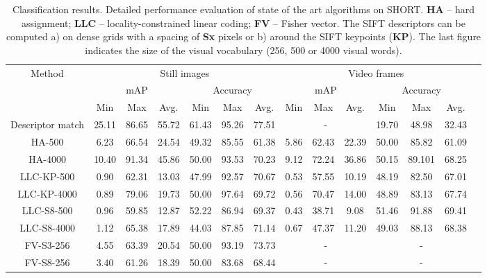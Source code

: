 \begin{table}
\centering
\begin{adjustbox}{max width=1.2\textwidth,center}
\begin{tabular}{cccccccccccccc}
   \toprule
\multirow{3}{*}{Method} & \multicolumn{6}{c}{Still images} & \multicolumn{6}{c}{Video frames}\\
\cline{2-13} 
 &  \multicolumn{3}{c}{mAP} & \multicolumn{3}{c}{Accuracy} & \multicolumn{3}{c}{mAP} & \multicolumn{3}{c}{ Accuracy}\\
& Min & Max & Avg. & Min & Max & Avg. & Min & Max & Avg. & Min & Max & Avg.\\
\hline \hline 
Descriptor match & 25.11 & 86.65 & 55.72 & 61.43 & 95.26 & 77.51 & \multicolumn{3}{c}{-} & 19.70 & 48.98 & 32.43\\
\hline
HA-500 & 6.23 & 66.54 & 24.54 & 49.32 & 85.55 & 61.38 & 5.86 & 62.43 & 22.39 &50.00 & 85.82 & 61.09\\
\hline
HA-4000 & 10.40 & 91.34 & 45.86 & 50.00 & 93.53 & 70.23 & 9.12 & 72.24 & 36.86 & 50.15 & 89.101 & 68.25 \\
\hline
LLC-KP-500 & 0.90 & 62.31 & 13.03 & 47.99 & 92.57 & 70.67  & 0.53 & 57.55 & 10.19 & 48.19 & 82.50 & 67.01\\
\hline
LLC-KP-4000 & 0.89 & 79.06 & 19.73 & 50.00 & 97.64 & 69.72 & 0.56 & 70.47 & 14.00 & 48.89 & 83.13 & 67.74 \\
\hline
LLC-S8-500 & 0.96 & 59.85 & 12.87 & 52.22 & 86.94 & 69.37 & 0.43 & 38.71 & 9.08 & 51.46 & 91.88 & 69.41\\
\hline
LLC-S8-4000 & 1.12 & 65.38 & 17.89 & 44.03 & 87.85 & 71.14 & 0.67 & 47.37 & 11.20 & 49.03 & 88.13 & 68.38\\
\hline
FV-S3-256 & 4.55 & 63.39 & 20.54 & 50.00 & 93.19 & 73.73 & \multicolumn{3}{c}{-} & \multicolumn{3}{c}{-}\\
\hline
FV-S8-256 & 3.40 & 61.26 &  18.39 & 50.00 & 83.68 & 68.44  & \multicolumn{3}{c}{-} & \multicolumn{3}{c}{-}\\
	\bottomrule
\end{tabular}
\end{adjustbox}
\caption{Classification results. Detailed performance evaluation of state of the art algorithms on SHORT. \textbf{HA} -- hard assignment; \textbf{LLC} -- locality-constrained linear coding; \textbf{FV} -- Fisher vector. The SIFT descriptors can be computed a) on dense grids with a spacing of \textbf{Sx} pixels or b) around the SIFT keypoints (\textbf{KP}). The last figure indicates the size of the visual vocabulary (256, 500 or 4000 visual words).}
\label{table:classification_results}
\end{table}

